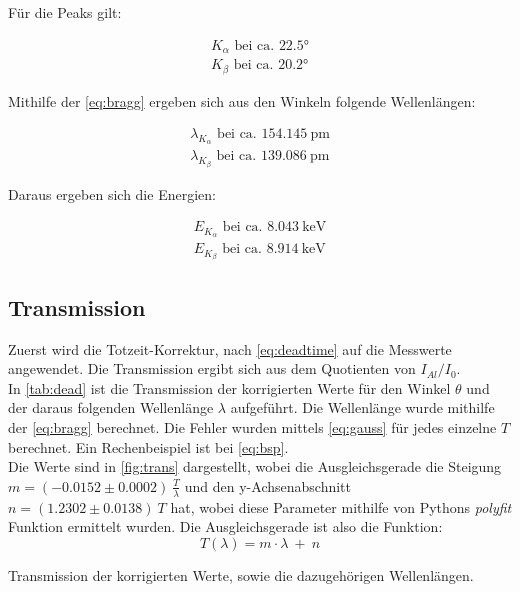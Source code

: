 Für die Peaks gilt:

\begin{align*}
  K_{\alpha} \text{ bei ca. } \ang{22.5}\\
  K_{\beta} \text{ bei ca. } \ang{20.2}
\end{align*}

Mithilfe der \autoref{eq:bragg} ergeben sich aus den Winkeln folgende Wellenlängen:

\begin{align*}
  \lambda_{K_{\alpha}} \text{ bei ca. } \SI{154.145}{\pico\metre}\\
  \lambda_{K_{\beta}} \text{ bei ca. } \SI{139.086}{\pico\metre}
\end{align*}

Daraus ergeben sich die Energien:

\begin{align*}
  E_{K_{\alpha}} \text{ bei ca. } \SI{8.043}{\kilo \electronvolt}\\
  E_{K_{\beta}} \text{ bei ca. } \SI{8.914}{\kilo \electronvolt}
\end{align*}
\newpage
\subsection{Transmission}

Zuerst wird die Totzeit-Korrektur, nach \autoref{eq:deadtime} auf die Messwerte angewendet.
Die Transmission ergibt sich aus dem Quotienten von $I_{Al}/I_{0}$.\\
In \autoref{tab:dead} ist die Transmission der korrigierten Werte für den Winkel $\theta$ und der daraus folgenden Wellenlänge $\lambda$ aufgeführt.
Die Wellenlänge wurde mithilfe der \autoref{eq:bragg} berechnet. Die Fehler wurden mittels \autoref{eq:gauss} für jedes einzelne $T$ berechnet. Ein Rechenbeispiel ist bei \autoref{eq:bsp}.\\
Die Werte sind in \autoref{fig:trans} dargestellt, wobei die Ausgleichsgerade die Steigung $m = (-0.0152\pm0.0002)\ \frac{T}{\lambda}$ und den y-Achsenabschnitt $n = (1.2302\pm0.0138)\ T$ hat, wobei diese Parameter mithilfe von Pythons \textit{polyfit} Funktion \cite{numpy} ermittelt wurden.
Die Ausgleichsgerade ist also die Funktion:
\begin{equation}
  T(\lambda) = m\cdot \lambda\ +\ n
  \label{eq:fkt}
\end{equation}

\begin{table}
  \centering
  \caption{Transmission der korrigierten Werte, sowie die dazugehörigen Wellenlängen.}
  \label{tab:dead}
\end{table}

